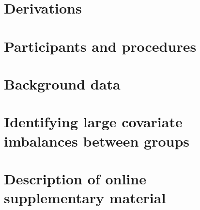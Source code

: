 \documentclass[12pt]{article}
\begin{document}
\begin{appendices}

  \startcontents[sections]

  \clearpage

\section{Derivations}

    \label{appendix:theory}

    


    \clearpage

\section{Participants and procedures}

    \label{appendix:participants}

    


    \clearpage

\section{Background data}

    \label{appendix:background}

    


    \clearpage

\section{Identifying large covariate imbalances between groups}

    \label{appendix:largeImbalances}

    


    \clearpage

\section{Description of online supplementary material}

  \label{appendix:onlineSupplementaryMaterial}

  

\end{appendices}
\end{document}
